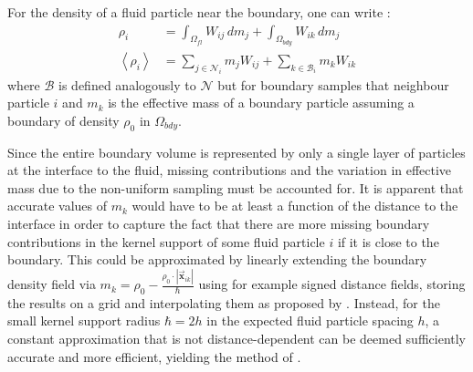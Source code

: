 \documentclass[oneside, a4paper]{book}
\newcommand\abs[1]{\left|#1\right|}
\newcommand\angled[1]{\left\langle#1\right\rangle}
\newcommand\vek[1]{\vec{\bm{#1}}}
\begin{document}
    For the density of a fluid particle near the boundary, one can write \autocite{density-maps}:
    \begin{align}
      \rho_i &= \int_{\Omega_{fl}} W_{ij} \,dm_j+  \int_{\Omega_{bdy}} W_{ik} \,dm_j\\
      \angled{\rho_i} &= \sum_{j\in\mathcal{N}_i} m_jW_{ij} + \sum_{k\in\mathcal{B}_i} m_k W_{ik}
    \end{align}
    where $\mathcal{B}$ is defined analogously to $\mathcal{N}$ but for boundary samples that neighbour particle $i$ and $m_k$ is the effective mass of a boundary particle assuming a boundary of density $\rho_0$ in $\Omega_{bdy}$.

    Since the entire boundary volume is represented by only a single layer of particles at the interface to the fluid, missing contributions and the variation in effective mass due to the non-uniform sampling must be accounted for. It is apparent that accurate values of $m_k$ would have to be at least a function of the distance to the interface in order to capture the fact that there are more missing boundary contributions in the kernel support of some fluid particle $i$ if it is close to the boundary. This could be approximated by linearly extending the boundary density field via $m_k = \rho_0 - \frac{\rho_0\cdot \abs{\vek{x}_{ik}}}{\hbar}$ using for example signed distance fields, storing the results on a grid and interpolating them as proposed by \autocite[Koshier and Bender]{density-maps}. Instead, for the small kernel support radius $\hbar=2h$ in the expected fluid particle spacing $h$, a constant approximation that is not distance-dependent can be deemed sufficiently accurate and more efficient, yielding the method of \autocite[Akinci et al.]{versatile-boundary-akinci}.
\end{document}
